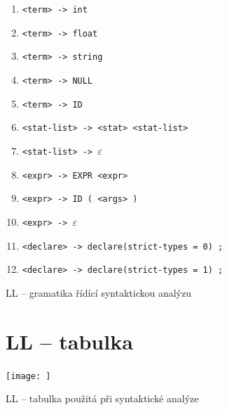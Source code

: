 \documentclass[a4paper, 11pt]{article}
\begin{document}
\begin{table}[!ht]
\begin{enumerate}[noitemsep]
			\item \verb|<term> -> int|
			\item \verb|<term> -> float|
			\item \verb|<term> -> string|
			\item \verb|<term> -> NULL|
			\item \verb|<term> -> ID|

			\item \verb|<stat-list> -> <stat> <stat-list>|
			\item \verb|<stat-list> -> |$\varepsilon$

			\item \verb|<expr> -> EXPR <expr>|
			\item \verb|<expr> -> ID ( <args> )|
			\item \verb|<expr> -> |$\varepsilon$

			\item \verb|<declare> -> declare(strict-types = 0) ;|
			\item \verb|<declare> -> declare(strict-types = 1) ;|

		\end{enumerate}

		\caption{LL -- gramatika řídící syntaktickou analýzu}
		\label{table:ll_gramatika}
	\end{table}

    \newpage
	\section{LL -- tabulka}
	\begin{table}[!ht]
		\centering
		\texttt{[image: ]}
		\caption{LL -- tabulka použitá při syntaktické analýze}
		\label{table:ll_table}
	\end{table}

    \newpage
\end{document}
